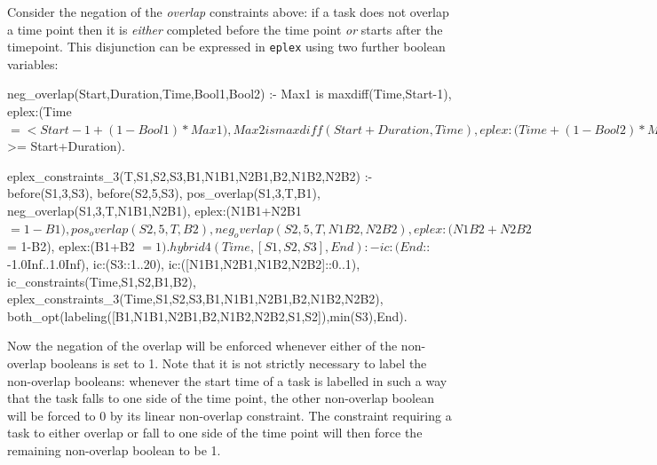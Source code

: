 Consider the negation of the {\em overlap} constraints above: if a task does
not overlap a time point then it is {\em either} completed before the
time point {\em or} starts after the timepoint. This disjunction can
be expressed in {\tt eplex} using two further boolean variables:
\begin{code}
neg_overlap(Start,Duration,Time,Bool1,Bool2) :-
        Max1 is maxdiff(Time,Start-1),
        eplex:(Time $=< Start-1+(1-Bool1)*Max1),
        Max2 is maxdiff(Start+Duration,Time),
        eplex:(Time+(1-Bool2)*Max2 $>= Start+Duration).

eplex_constraints_3(T,S1,S2,S3,B1,N1B1,N2B1,B2,N1B2,N2B2) :-
        before(S1,3,S3),
        before(S2,5,S3),
        pos_overlap(S1,3,T,B1),
        neg_overlap(S1,3,T,N1B1,N2B1),
        eplex:(N1B1+N2B1 $= 1-B1),
        pos_overlap(S2,5,T,B2),
        neg_overlap(S2,5,T,N1B2,N2B2),
        eplex:(N1B2+N2B2 $= 1-B2),
        eplex:(B1+B2 $= 1).

hybrid4(Time, [S1,S2,S3], End) :-
        ic:(End $:: -1.0Inf..1.0Inf),
        ic:(S3::1..20),
        ic:([N1B1,N2B1,N1B2,N2B2]::0..1),
        ic_constraints(Time,S1,S2,B1,B2),
        eplex_constraints_3(Time,S1,S2,S3,B1,N1B1,N2B1,B2,N1B2,N2B2),
        both_opt(labeling([B1,N1B1,N2B1,B2,N1B2,N2B2,S1,S2]),min(S3),End).
\end{code}

Now the negation of the overlap will be enforced whenever either of
the non-overlap booleans is set to 1. Note that it is not strictly
necessary to label the non-overlap booleans: whenever the start time
of a task is labelled in such a way that the task falls to one side of
the time point, the other non-overlap boolean will be forced to 0
by its linear non-overlap constraint. The constraint requiring a task
to either overlap or fall to one side of the time point will then
force the remaining non-overlap boolean to be 1.

